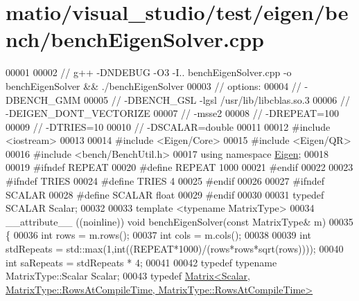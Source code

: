 \hypertarget{matio_2visual__studio_2test_2eigen_2bench_2bench_eigen_solver_8cpp_source}{}\section{matio/visual\+\_\+studio/test/eigen/bench/bench\+Eigen\+Solver.cpp}
\label{matio_2visual__studio_2test_2eigen_2bench_2bench_eigen_solver_8cpp_source}

\begin{DoxyCode}
00001 
00002 \textcolor{comment}{// g++ -DNDEBUG -O3 -I.. benchEigenSolver.cpp  -o benchEigenSolver && ./benchEigenSolver}
00003 \textcolor{comment}{// options:}
00004 \textcolor{comment}{//  -DBENCH\_GMM}
00005 \textcolor{comment}{//  -DBENCH\_GSL -lgsl /usr/lib/libcblas.so.3}
00006 \textcolor{comment}{//  -DEIGEN\_DONT\_VECTORIZE}
00007 \textcolor{comment}{//  -msse2}
00008 \textcolor{comment}{//  -DREPEAT=100}
00009 \textcolor{comment}{//  -DTRIES=10}
00010 \textcolor{comment}{//  -DSCALAR=double}
00011 
00012 \textcolor{preprocessor}{#include <iostream>}
00013 
00014 \textcolor{preprocessor}{#include <Eigen/Core>}
00015 \textcolor{preprocessor}{#include <Eigen/QR>}
00016 \textcolor{preprocessor}{#include <bench/BenchUtil.h>}
00017 \textcolor{keyword}{using namespace }\hyperlink{namespace_eigen}{Eigen};
00018 
00019 \textcolor{preprocessor}{#ifndef REPEAT}
00020 \textcolor{preprocessor}{#define REPEAT 1000}
00021 \textcolor{preprocessor}{#endif}
00022 
00023 \textcolor{preprocessor}{#ifndef TRIES}
00024 \textcolor{preprocessor}{#define TRIES 4}
00025 \textcolor{preprocessor}{#endif}
00026 
00027 \textcolor{preprocessor}{#ifndef SCALAR}
00028 \textcolor{preprocessor}{#define SCALAR float}
00029 \textcolor{preprocessor}{#endif}
00030 
00031 \textcolor{keyword}{typedef} SCALAR Scalar;
00032 
00033 \textcolor{keyword}{template} <\textcolor{keyword}{typename} MatrixType>
00034 \_\_attribute\_\_ ((noinline)) \textcolor{keywordtype}{void} benchEigenSolver(\textcolor{keyword}{const} MatrixType& m)
00035 \{
00036   \textcolor{keywordtype}{int} rows = m.rows();
00037   \textcolor{keywordtype}{int} cols = m.cols();
00038 
00039   \textcolor{keywordtype}{int} stdRepeats = std::max(1,\textcolor{keywordtype}{int}((REPEAT*1000)/(rows*rows*sqrt(rows))));
00040   \textcolor{keywordtype}{int} saRepeats = stdRepeats * 4;
00041 
00042   \textcolor{keyword}{typedef} \textcolor{keyword}{typename} MatrixType::Scalar Scalar;
00043   \textcolor{keyword}{typedef} 
      \hyperlink{group___core___module_class_eigen_1_1_matrix}{Matrix<Scalar, MatrixType::RowsAtCompileTime, MatrixType::RowsAtCompileTime>}

\end{DoxyCode}
